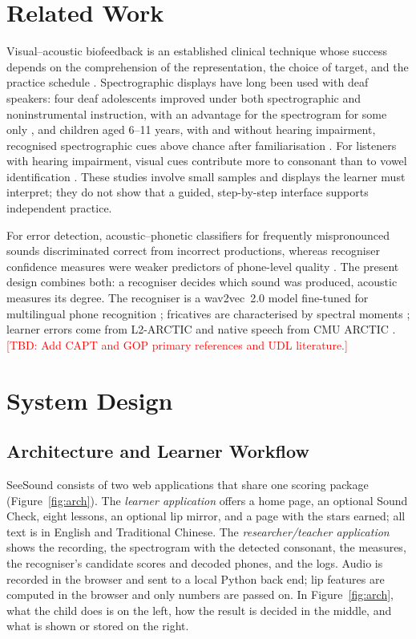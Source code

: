 \documentclass[engproc,article,submit,moreauthors]{Definitions/mdpi}
\newcommand{\tbd}[1]{\textcolor{red}{[TBD: #1]}}
\begin{document}
\section{Related Work}
Visual--acoustic biofeedback is an established clinical technique whose success depends on the comprehension of the representation, the choice of target, and the practice schedule \cite{hitchcock2023}. Spectrographic displays have long been used with deaf speakers: four deaf adolescents improved under both spectrographic and noninstrumental instruction, with an advantage for the spectrogram for some only \cite{ertmermaki2000}, and children aged 6--11 years, with and without hearing impairment, recognised spectrographic cues above chance after familiarisation \cite{ertmer2004}. For listeners with hearing impairment, visual cues contribute more to consonant than to vowel identification \cite{moradi2017,desai2008}. These studies involve small samples and displays the learner must interpret; they do not show that a guided, step-by-step interface supports independent practice.

For error detection, acoustic--phonetic classifiers for frequently mispronounced sounds discriminated correct from incorrect productions, whereas recogniser confidence measures were weaker predictors of phone-level quality \cite{truong2005}. The present design combines both: a recogniser decides which sound was produced, acoustic measures its degree. The recogniser is a wav2vec~2.0 model \cite{baevski2020} fine-tuned for multilingual phone recognition \cite{xu2022}; fricatives are characterised by spectral moments \cite{jongman2000}; learner errors come from L2-ARCTIC \cite{zhao2018} and native speech from CMU ARCTIC \cite{kominek2004}. \tbd{Add CAPT and GOP primary references and UDL literature.}

\section{System Design}
\subsection{Architecture and Learner Workflow}
SeeSound consists of two web applications that share one scoring package (Figure~\ref{fig:arch}). The \emph{learner application} offers a home page, an optional Sound Check, eight lessons, an optional lip mirror, and a page with the stars earned; all text is in English and Traditional Chinese. The \emph{researcher/teacher application} shows the recording, the spectrogram with the detected consonant, the measures, the recogniser's candidate scores and decoded phones, and the logs. Audio is recorded in the browser and sent to a local Python back end; lip features are computed in the browser and only numbers are passed on. In Figure~\ref{fig:arch}, what the child does is on the left, how the result is decided in the middle, and what is shown or stored on the right.
\end{document}

